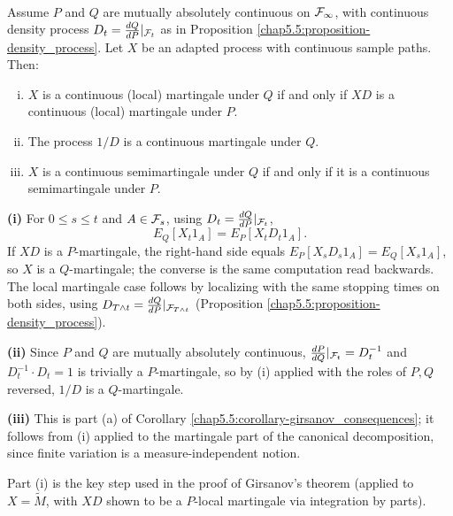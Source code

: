 \begin{proposition}\label{chap5.5:proposition-bayes_rule}
\\
Assume $P$ and $Q$ are mutually absolutely continuous on $\mathcal{F}_\infty$, with continuous density process $D_t=\frac{dQ}{dP}|_{\mathcal{F}_t}$ as in Proposition \ref{chap5.5:proposition-density_process}. Let $X$ be an adapted process with continuous sample paths. Then:
\begin{enumerate}[(i)]
    \item $X$ is a continuous (local) martingale under $Q$ if and only if $XD$ is a continuous (local) martingale under $P$.
    \item The process $1/D$ is a continuous martingale under $Q$.
    \item $X$ is a continuous semimartingale under $Q$ if and only if it is a continuous semimartingale under $P$.
\end{enumerate}
\end{proposition}

\begin{proofidea}
\textbf{(i)} For $0\leq s\leq t$ and $A\in\mathcal{F}_s$, using $D_t=\frac{dQ}{dP}|_{\mathcal{F}_t}$,
$$E_Q[X_t1_A]=E_P[X_tD_t1_A].$$
If $XD$ is a $P$-martingale, the right-hand side equals $E_P[X_sD_s1_A]=E_Q[X_s1_A]$, so $X$ is a $Q$-martingale; the converse is the same computation read backwards. The local martingale case follows by localizing with the same stopping times on both sides, using $D_{T\wedge t}=\frac{dQ}{dP}|_{\mathcal{F}_{T\wedge t}}$ (Proposition \ref{chap5.5:proposition-density_process}).

\textbf{(ii)} Since $P$ and $Q$ are mutually absolutely continuous, $\frac{dP}{dQ}|_{\mathcal{F}_t}=D_t^{-1}$ and $D_t^{-1}\cdot D_t=1$ is trivially a $P$-martingale, so by (i) applied with the roles of $P,Q$ reversed, $1/D$ is a $Q$-martingale.

\textbf{(iii)} This is part (a) of Corollary \ref{chap5.5:corollary-girsanov_consequences}; it follows from (i) applied to the martingale part of the canonical decomposition, since finite variation is a measure-independent notion.
\end{proofidea}

\begin{remark}
Part (i) is the key step used in the proof of Girsanov's theorem (applied to $X=\tilde M$, with $XD$ shown to be a $P$-local martingale via integration by parts).
\end{remark}

